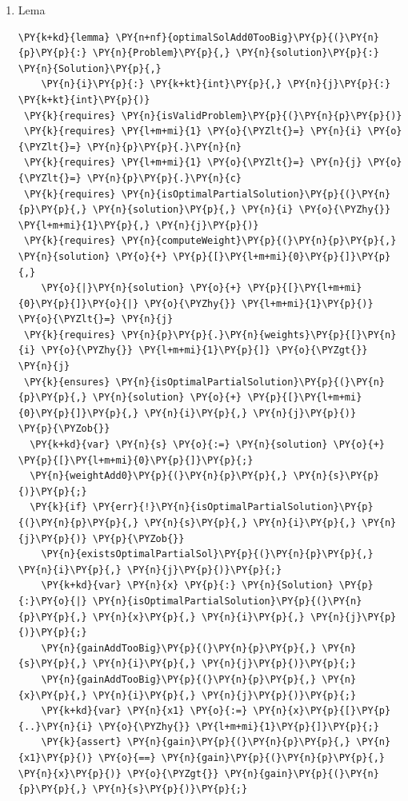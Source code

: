 \begin{sloppypar}
\begin{enumerate}
     \item Lema 
     \begin{Verbatim}[commandchars=\\\{\}]
\PY{k+kd}{lemma} \PY{n+nf}{optimalSolAdd0TooBig}\PY{p}{(}\PY{n}{p}\PY{p}{:} \PY{n}{Problem}\PY{p}{,} \PY{n}{solution}\PY{p}{:} \PY{n}{Solution}\PY{p}{,} 
    \PY{n}{i}\PY{p}{:} \PY{k+kt}{int}\PY{p}{,} \PY{n}{j}\PY{p}{:} \PY{k+kt}{int}\PY{p}{)}
 \PY{k}{requires} \PY{n}{isValidProblem}\PY{p}{(}\PY{n}{p}\PY{p}{)}
 \PY{k}{requires} \PY{l+m+mi}{1} \PY{o}{\PYZlt{}=} \PY{n}{i} \PY{o}{\PYZlt{}=} \PY{n}{p}\PY{p}{.}\PY{n}{n}
 \PY{k}{requires} \PY{l+m+mi}{1} \PY{o}{\PYZlt{}=} \PY{n}{j} \PY{o}{\PYZlt{}=} \PY{n}{p}\PY{p}{.}\PY{n}{c}
 \PY{k}{requires} \PY{n}{isOptimalPartialSolution}\PY{p}{(}\PY{n}{p}\PY{p}{,} \PY{n}{solution}\PY{p}{,} \PY{n}{i} \PY{o}{\PYZhy{}} \PY{l+m+mi}{1}\PY{p}{,} \PY{n}{j}\PY{p}{)}
 \PY{k}{requires} \PY{n}{computeWeight}\PY{p}{(}\PY{n}{p}\PY{p}{,} \PY{n}{solution} \PY{o}{+} \PY{p}{[}\PY{l+m+mi}{0}\PY{p}{]}\PY{p}{,} 
    \PY{o}{|}\PY{n}{solution} \PY{o}{+} \PY{p}{[}\PY{l+m+mi}{0}\PY{p}{]}\PY{o}{|} \PY{o}{\PYZhy{}} \PY{l+m+mi}{1}\PY{p}{)} \PY{o}{\PYZlt{}=} \PY{n}{j} 
 \PY{k}{requires} \PY{n}{p}\PY{p}{.}\PY{n}{weights}\PY{p}{[}\PY{n}{i} \PY{o}{\PYZhy{}} \PY{l+m+mi}{1}\PY{p}{]} \PY{o}{\PYZgt{}} \PY{n}{j}
 \PY{k}{ensures} \PY{n}{isOptimalPartialSolution}\PY{p}{(}\PY{n}{p}\PY{p}{,} \PY{n}{solution} \PY{o}{+} \PY{p}{[}\PY{l+m+mi}{0}\PY{p}{]}\PY{p}{,} \PY{n}{i}\PY{p}{,} \PY{n}{j}\PY{p}{)}
\PY{p}{\PYZob{}}
  \PY{k+kd}{var} \PY{n}{s} \PY{o}{:=} \PY{n}{solution} \PY{o}{+} \PY{p}{[}\PY{l+m+mi}{0}\PY{p}{]}\PY{p}{;}
  \PY{n}{weightAdd0}\PY{p}{(}\PY{n}{p}\PY{p}{,} \PY{n}{s}\PY{p}{)}\PY{p}{;}
  \PY{k}{if} \PY{err}{!}\PY{n}{isOptimalPartialSolution}\PY{p}{(}\PY{n}{p}\PY{p}{,} \PY{n}{s}\PY{p}{,} \PY{n}{i}\PY{p}{,} \PY{n}{j}\PY{p}{)} \PY{p}{\PYZob{}}
    \PY{n}{existsOptimalPartialSol}\PY{p}{(}\PY{n}{p}\PY{p}{,} \PY{n}{i}\PY{p}{,} \PY{n}{j}\PY{p}{)}\PY{p}{;}
    \PY{k+kd}{var} \PY{n}{x} \PY{p}{:} \PY{n}{Solution} \PY{p}{:}\PY{o}{|} \PY{n}{isOptimalPartialSolution}\PY{p}{(}\PY{n}{p}\PY{p}{,} \PY{n}{x}\PY{p}{,} \PY{n}{i}\PY{p}{,} \PY{n}{j}\PY{p}{)}\PY{p}{;}
    \PY{n}{gainAddTooBig}\PY{p}{(}\PY{n}{p}\PY{p}{,} \PY{n}{s}\PY{p}{,} \PY{n}{i}\PY{p}{,} \PY{n}{j}\PY{p}{)}\PY{p}{;}
    \PY{n}{gainAddTooBig}\PY{p}{(}\PY{n}{p}\PY{p}{,} \PY{n}{x}\PY{p}{,} \PY{n}{i}\PY{p}{,} \PY{n}{j}\PY{p}{)}\PY{p}{;}
    \PY{k+kd}{var} \PY{n}{x1} \PY{o}{:=} \PY{n}{x}\PY{p}{[}\PY{p}{..}\PY{n}{i} \PY{o}{\PYZhy{}} \PY{l+m+mi}{1}\PY{p}{]}\PY{p}{;}
    \PY{k}{assert} \PY{n}{gain}\PY{p}{(}\PY{n}{p}\PY{p}{,} \PY{n}{x1}\PY{p}{)} \PY{o}{==} \PY{n}{gain}\PY{p}{(}\PY{n}{p}\PY{p}{,} \PY{n}{x}\PY{p}{)} \PY{o}{\PYZgt{}} \PY{n}{gain}\PY{p}{(}\PY{n}{p}\PY{p}{,} \PY{n}{s}\PY{p}{)}\PY{p}{;}  

\end{Verbatim}
\end{enumerate}
\end{sloppypar}
